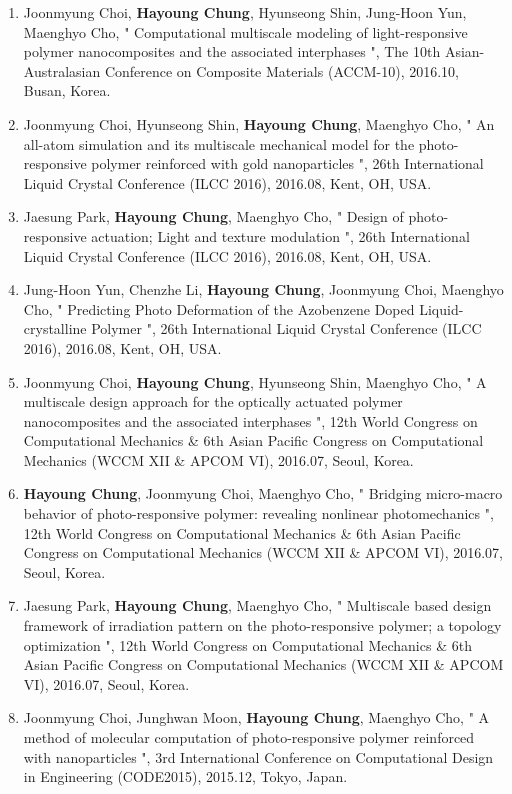 \documentclass[margin, 10pt]{res} %
\begin{document}
\begin{resume}
\begin{enumerate}
    \item Joonmyung Choi, \textbf{Hayoung Chung}, Hyunseong Shin, Jung-Hoon Yun, Maenghyo Cho, " Computational multiscale modeling of light-responsive polymer nanocomposites and the associated interphases ", The 10th Asian-Australasian Conference on Composite Materials (ACCM-10), 2016.10, Busan, Korea.
    \item Joonmyung Choi, Hyunseong Shin, \textbf{Hayoung Chung}, Maenghyo Cho, " An all-atom simulation and its multiscale mechanical model for the photo-responsive polymer reinforced with gold nanoparticles ", 26th International Liquid Crystal Conference (ILCC 2016), 2016.08, Kent, OH, USA.
    \item Jaesung Park, \textbf{Hayoung Chung}, Maenghyo Cho, " Design of photo-responsive actuation; Light and texture modulation ", 26th International Liquid Crystal Conference (ILCC 2016), 2016.08, Kent, OH, USA.
    \item Jung-Hoon Yun, Chenzhe Li, \textbf{Hayoung Chung}, Joonmyung Choi, Maenghyo Cho, " Predicting Photo Deformation of the Azobenzene Doped Liquid-crystalline Polymer ", 26th International Liquid Crystal Conference (ILCC 2016), 2016.08, Kent, OH, USA.
    \item Joonmyung Choi, \textbf{Hayoung Chung}, Hyunseong Shin, Maenghyo Cho, " A multiscale design approach for the optically actuated polymer nanocomposites and the associated interphases ", 12th World Congress on Computational Mechanics \& 6th Asian Pacific Congress on Computational Mechanics (WCCM XII \& APCOM VI), 2016.07, Seoul, Korea.
    \item \textbf{Hayoung Chung}, Joonmyung Choi, Maenghyo Cho, " Bridging micro-macro behavior of photo-responsive polymer: revealing nonlinear photomechanics ", 12th World Congress on Computational Mechanics \& 6th Asian Pacific Congress on Computational Mechanics (WCCM XII \& APCOM VI), 2016.07, Seoul, Korea.
    \item Jaesung Park, \textbf{Hayoung Chung}, Maenghyo Cho, " Multiscale based design framework of irradiation pattern on the photo-responsive polymer; a topology optimization ", 12th World Congress on Computational Mechanics \& 6th Asian Pacific Congress on Computational Mechanics (WCCM XII \& APCOM VI), 2016.07, Seoul, Korea.
    \item Joonmyung Choi, Junghwan Moon, \textbf{Hayoung Chung}, Maenghyo Cho, " A method of molecular computation of photo-responsive polymer reinforced with nanoparticles ", 3rd International Conference on Computational Design in Engineering (CODE2015), 2015.12, Tokyo, Japan.

\end{enumerate}
\end{resume}
\end{document}
